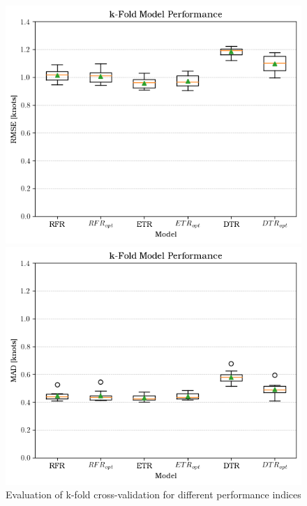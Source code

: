 \begin{figure}[ht]
    \vspace{0.1cm} %
  
    \begin{minipage}{0.45\textwidth}
      \centering
      \includegraphics[width=\textwidth]{02_figures/kfold_rmse_opt.png}
    \end{minipage}
    \hfill
    \begin{minipage}{0.45\textwidth}
      \centering
      \includegraphics[width=\textwidth]{02_figures/kfold_mad_opt.png}
    \end{minipage}
  
    \caption{Evaluation of k-fold cross-validation for different performance indices}
    \label{fig:k_fold_validation_result}
  \end{figure}


